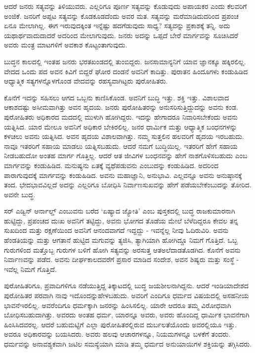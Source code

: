 \newpage

ಆದರೆ ಜನರು ಸತ್ಯವನ್ನು ತಿಳಿಯುವರು. ಎಲ್ಲರಿಗೂ ಪೂರ್ಣ ಸತ್ಯವನ್ನು ಕೊಡುವುದು ಅಪಾಯಕರ ಎಂದು ಕೆಲವರಿಗೆ ಅಂಜಿಕೆ. ಜನರಿಗೆ ಅಪ್ಪಟ ಸತ್ಯವನ್ನು ಕೊಡಕೂಡದೆಂದು ಅವರ ಮತ. ಸತ್ಯವನ್ನು ಮರೆಮಾಡಿದುದರಿಂದ ಪ್ರಪಂಚ ಏನೂ ಮೇಲಾಗಿಲ್ಲ. ಈಗ ಇರುವುದಕ್ಕಿಂತ ಇನ್ನೆಷ್ಟು ಹದಗೆಡುವುದು ಸಾಧ್ಯ? ಸತ್ಯವನ್ನು ಪ್ರಕಾಶಕ್ಕೆ ತನ್ನಿ. ಅದು ಯಥಾರ್ಥವಾದುದಾದರೆ ಅದರಿಂದ ಮೇಲಾಗುವುದು. ಜನರು ಅದನ್ನು ಒಪ್ಪದೆ ಬೇರೆ ಮಾರ್ಗವನ್ನು ಸೂಚಿಸಿದರೆ ಅವರು ಮಂತ್ರ ಮಾಟಗಳಿಗೆ ಅವಕಾಶ ಕೊಟ್ಟಂತಾಗುವುದು.

ಬುದ್ಧನ ಕಾಲದಲ್ಲಿ ಇಂತಹ ಜನರು ಭರತಖಂಡದಲ್ಲಿ ತುಂಬಿದ್ದರು. ಜನಸಾಮಾನ್ಯನಿಗೆ ಯಾವ ಜ್ಞಾನಕ್ಕೂ ಹಕ್ಕಿರಲಿಲ್ಲ. ವೇದದ ಒಂದು ಪದ ಅವನ ಕಿವಿಗೆ ಬಿದ್ದರೆ ಘೋರ ದಂಡನೆ ಅವನಿಗೆ ಕಾದಿತ್ತು. ಪುರಾತನ ಹಿಂದೂಗಳು ಕಂಡುಹಿಡಿದ ಆಧ್ಯಾತ್ಮಿಕ ಸತ್ಯಗಳನ್ನೊಳಗೊಂಡ ವೇದವನ್ನು ರಹಸ್ಯವಾಗಿಟ್ಟರು ಪುರೋಹಿತರು.

ಕೊನೆಗೆ ಇದನ್ನು ಸಹಿಸಲು ಆಗದ ಒಬ್ಬನು ಕಾಣಿಸಿಕೊಂಡ. ಅವನಿಗೆ ಬುದ್ಧಿ ಇತ್ತು. ಶಕ್ತಿ ಇತ್ತು. ವಿಶಾಲವಾದ ಆಕಾಶದಷ್ಟು ಅಸೀಮವಾಗಿತ್ತು ಅವನ ಹೃದಯ. ಜನರು ಪುರೋಹಿತರನ್ನು ಅನುಸರಿಸುತ್ತಿದ್ದುದನ್ನು ಅವನು ಕಂಡ. ಪುರೋಹಿತರು ಅಧಿಕಾರದ ಮದದಲ್ಲಿ ಮುಳುಗಿ ಹೋಗಿದ್ದರು. ಇದನ್ನು ಹೇಗಾದರೂ ನಿವಾರಿಸಬೇಕೆಂದು ಅವನು ಯತ್ನಿಸಿದ. ಯಾರ ಮೇಲೂ ಅವನಿಗೆ ಅಧಿಕಾರ ಬೇಕಿರಲಿಲ್ಲ. ಜನರ ಧಾರ್ಮಿಕ ಮತ್ತು ಆಧ್ಯಾತ್ಮಿಕ ಬಂಧನಗಳನ್ನು ಕಳಚಲು ಅವನು ಯತ್ನಿಸಿದ. ಅವನ ಹೃದಯ ವಿಶಾಲ\-ವಾಗಿತ್ತು. ನಮ್ಮ ಸುತ್ತಲಿನ ಹಲವರಿಗೆ ಹೃದಯ ಇರಬಹುದು. ನಾವೂ ಇತರರಿಗೆ ಸಹಾಯ ಮಾಡಲು ಯತ್ನಿಸಬಹುದು. ಆದರೆ ನಮಗೆ ಬುದ್ಧಿಯಿಲ್ಲ. ಇತರರಿಗೆ ಹೇಗೆ ಸಹಾಯ ನೀಡಬಹುದೋ ಅಂತಹ ಮಾರ್ಗ ಗೊತ್ತಿಲ್ಲ. ಆದರೆ ಆತ ಜೀವಿಗಳ ಬಂಧನವನ್ನು ಹೇಗೆ ನಾಶಗೊಳಿಸಬಹುದು ಎಂಬ ಮಾರ್ಗವನ್ನು ಕಂಡುಹಿಡಿದ. ಮನುಷ್ಯನು ಏತಕ್ಕೆ ವ್ಯಥೆಪಡುವನು ಎಂಬುದನ್ನು ಕಂಡುಹಿಡಿದ. ಅದರಿಂದ ಪಾರಾಗುವುದಕ್ಕೆ ಮಾರ್ಗವನ್ನು ಕಂಡುಹಿಡಿದ. ಅವನು ಮಹಾಜ್ಞಾನಿ, ಅನುಭಾವಿ. ಎಲ್ಲವನ್ನೂ ಅವನು ಅನುಷ್ಠಾನಕ್ಕೆ ತಂದ. ಭೇದಭಾವವಿಲ್ಲದೆ ಅದನ್ನು ಎಲ್ಲರಿಗೂ ಬೋಧಿಸಿ ನಿರ್ವಾಣಸುಖವನ್ನು ಹೇಗೆ ಪಡೆಯಬೇಕೆಂಬುದನ್ನು ತೋರಿದ. ಅವನೇ ಬುದ್ಧ.

ಸರ್​ ಎಡ್ವಿನ್​ ಆರ್ನಾಲ್ಡ್​ ಎಂಬುವನು ಬರೆದ ‘ಏಷ್ಯಾದ ಜ್ಯೋತಿ’ ಎಂಬ ಪುಸ್ತಕದಲ್ಲಿ ಬುದ್ಧ ರಾಜಕುಮಾರನಾಗಿ ಹುಟ್ಟಿದ್ದು, ಪ್ರಪಂಚದ ದುಃಖ ಅವನಿಗೆ ತಟ್ಟಿದ್ದು, ಅವನು ಭೋಗದ ತೊಡೆಯ ಮೇಲೆ ಬೆಳೆದಿದ್ದರೂ ಕೇವಲ ತನ್ನ ಸುಖದಿಂದ ಮತ್ತು ರಕ್ಷಣೆಯಿಂದ ಅವನಿಗೆ ಆನಂದವಾಗದೆ ಇದ್ದದ್ದು - ಇವನ್ನೆಲ್ಲ ನೀವು ಓದಿರುವಿರಿ. ಅವನು ಹೆಂಡತಿಯನ್ನು ಮತ್ತು ಆಗತಾನೆ ಹುಟ್ಟಿದ ಮಗುವನ್ನು ತ್ಯಜಿಸಿ, ತ್ಯಾಗಿಯಾಗಿ ಹೋಗಿದ್ದೂ ನಿಮಗೆ ಗೊತ್ತಿದೆ. ಒಬ್ಬ ಗುರುಗಳಿಂದ ಮತ್ತೊಬ್ಬ ಗುರುಗಳ ಬಳಿಗೆ ಹೋಗಿ ಸತ್ಯವನ್ನು ಅರಸುತ್ತ ಆತ\break ಅಲೆದಾಡತೊಡಗಿದ. ಕೊನೆಗೆ ಅವನು ನಿರ್ವಾಣವನ್ನು ಪಡೆದ. ಅವನು ದೀರ್ಘಕಾಲದವರೆಗೆ ಪ್ರಸಾರ ಮಾಡಿದ ಸಂದೇಶ, ಅವನ ಶಿಷ್ಯರು ಮತ್ತು ಸಂಸ್ಥೆ - ಇವೆಲ್ಲ ನಿಮಗೆ ಗೊತ್ತಿದೆ.

ಪುರೋಹಿತರಿಗೂ, ಪ್ರವಾದಿಗಳಿಗೂ ನಡೆಯುತ್ತಿದ್ದ ತಿಕ್ಕಾಟದಲ್ಲಿ ಬುದ್ಧ ಜಯಶೀಲ\-ನಾಗಿದ್ದನು. ಆದರೆ ಇಂಡಿಯಾದೇಶದ ಪುರೋಹಿತರ ಪರವಾಗಿ ನಾವು ಇದೊಂದನ್ನು\break ಹೇಳಬಹುದು. ಅವರಿಗೆ ಎಂದಿಗೂ ಧರ್ಮದ ವಿಷಯದಲ್ಲಿ ಅಸಹನೀಯ ಭಾವನೆ\break ಇರಲಿಲ್ಲ. ಅವರೆಂದಿಗೂ ಧರ್ಮಕ್ಕಾಗಿ ಜನರನ್ನು ಹಿಂಸಿಸಲಿಲ್ಲ. ಯಾರೇ ಆದರೂ ತಮ್ಮ ವಿರೋಧವಾಗಿ ಬೋಧಿಸಬಹುದಾಗಿತ್ತು. ಅವರದು ಅಂತಹ ಧರ್ಮ, ಯಾರನ್ನೂ ಅವರು, ಅವರು ಹೊಂದಿದ್ದ ಧಾರ್ಮಿಕ ಭಾವನೆಗಾಗಿ ಹಿಂಸಿಸಿದವರಲ್ಲ. ಆದರೆ ಬಹುಮಟ್ಟಿಗೆ ಎಲ್ಲಾ ಪುರೋಹಿತರಲ್ಲಿರುವ ದುರ್ಬಲತೆಯೊಂದು ಅವರಲ್ಲಿಯೂ ಇತ್ತು. ಅವರೂ ಅಧಿಕಾರ\-ವನ್ನು ಬಯಸಿದರು. ಅವರು ಹಲವು ಆಚಾರಗಳನ್ನೂ, ನಿಯಮಗಳನ್ನೂ ಬಳಕೆಗೆ ತಂದರು. ಧರ್ಮವನ್ನು ಅನಾವಶ್ಯಕವಾಗಿ ಜಟಿಲ ಸಮಸ್ಯೆಯಾಗಿ ಮಾಡಿ ತಮ್ಮ ಧರ್ಮದ ಅನುಯಾಯಿಗಳ ಶಕ್ತಿಯನ್ನು ತಗ್ಗಿಸಿದರು.

